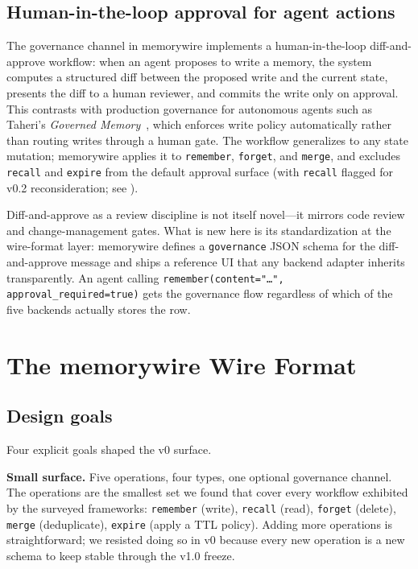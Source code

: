 \documentclass[11pt,letterpaper,twocolumn]{article}
\begin{document}
\subsection{Human-in-the-loop approval for agent actions}

The governance channel in memorywire implements a human-in-the-loop diff-and-approve workflow: when an agent proposes to write a memory, the system computes a structured diff between the proposed write and the current state, presents the diff to a human reviewer, and commits the write only on approval. This contrasts with production governance for autonomous agents such as Taheri's \emph{Governed Memory}~\cite{taheri2026governed}, which enforces write policy automatically rather than routing writes through a human gate. The workflow generalizes to any state mutation; memorywire applies it to \texttt{remember}, \texttt{forget}, and \texttt{merge}, and excludes \texttt{recall} and \texttt{expire} from the default approval surface (with \texttt{recall} flagged for v0.2 reconsideration; see ).

Diff-and-approve as a review discipline is not itself novel---it mirrors code review and change-management gates. What is new here is its standardization at the wire-format layer: memorywire defines a \texttt{governance} JSON schema for the diff-and-approve message and ships a reference UI that any backend adapter inherits transparently. An agent calling \texttt{remember(content="\ldots", approval\_required=true)} gets the governance flow regardless of which of the five backends actually stores the row.

\section{The memorywire Wire Format}
\label{sec:spec}

\subsection{Design goals}
\label{sec:spec-goals}

Four explicit goals shaped the v0 surface.

\textbf{Small surface.} Five operations, four types, one optional governance channel. The operations are the smallest set we found that cover every workflow exhibited by the surveyed frameworks: \texttt{remember} (write), \texttt{recall} (read), \texttt{forget} (delete), \texttt{merge} (deduplicate), \texttt{expire} (apply a TTL policy). Adding more operations is straightforward; we resisted doing so in v0 because every new operation is a new schema to keep stable through the v1.0 freeze.
\end{document}
